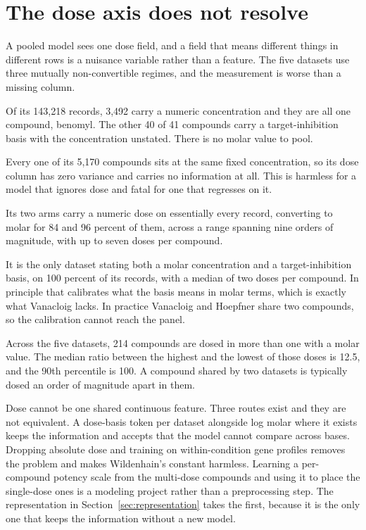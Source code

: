 
\section{The dose axis does not resolve}
\label{sec:dose}

A pooled model sees one dose field, and a field that means different things in different
rows is a nuisance variable rather than a feature. The five datasets use three mutually
non-convertible regimes, and the measurement is worse than a missing column.

Of its 143{,}218 records, 3{,}492 carry a numeric concentration and they are all one
compound, benomyl. The other 40 of 41 compounds carry a target-inhibition basis with the
concentration unstated. There is no molar value to pool.

Every one of its 5{,}170 compounds sits at the same fixed concentration, so its dose column
has zero variance and carries no information at all. This is harmless for a model that
ignores dose and fatal for one that regresses on it.

Its two arms carry a numeric dose on essentially every record, converting to molar for 84
and 96 percent of them, across a range spanning nine orders of magnitude, with up to seven
doses per compound.

It is the only dataset stating both a molar concentration and a target-inhibition basis, on
100 percent of its records, with a median of two doses per compound. In principle that
calibrates what the basis means in molar terms, which is exactly what Vanacloig lacks. In
practice Vanacloig and Hoepfner share two compounds, so the calibration cannot reach the
panel.

Across the five datasets, 214 compounds are dosed in more than one with a molar value. The
median ratio between the highest and the lowest of those doses is 12.5, and the 90th
percentile is 100. A compound shared by two datasets is typically dosed an order of
magnitude apart in them.

Dose cannot be one shared continuous feature. Three routes exist and they are not
equivalent. A dose-basis token per dataset alongside log molar where it exists keeps the
information and accepts that the model cannot compare across bases. Dropping absolute dose
and training on within-condition gene profiles removes the problem and makes Wildenhain's
constant harmless. Learning a per-compound potency scale from the multi-dose compounds and
using it to place the single-dose ones is a modeling project rather than a preprocessing
step. The representation in Section~\ref{sec:representation} takes the first, because it is
the only one that keeps the information without a new model.
